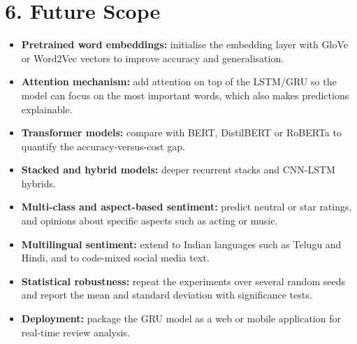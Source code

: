 \documentclass[12pt,a4paper,oneside]{report}
\begin{document}
\chapter*{6. Future Scope}
\begin{itemize}
\item \textbf{Pretrained word embeddings:} initialise the embedding layer with GloVe or Word2Vec vectors to improve accuracy and generalisation.
\item \textbf{Attention mechanism:} add attention on top of the LSTM/GRU so the model can focus on the most important words, which also makes predictions explainable.
\item \textbf{Transformer models:} compare with BERT, DistilBERT or RoBERTa to quantify the accuracy-versus-cost gap.
\item \textbf{Stacked and hybrid models:} deeper recurrent stacks and CNN-LSTM hybrids.
\item \textbf{Multi-class and aspect-based sentiment:} predict neutral or star ratings, and opinions about specific aspects such as acting or music.
\item \textbf{Multilingual sentiment:} extend to Indian languages such as Telugu and Hindi, and to code-mixed social media text.
\item \textbf{Statistical robustness:} repeat the experiments over several random seeds and report the mean and standard deviation with significance tests.
\item \textbf{Deployment:} package the GRU model as a web or mobile application for real-time review analysis.
\end{itemize}
\end{document}

